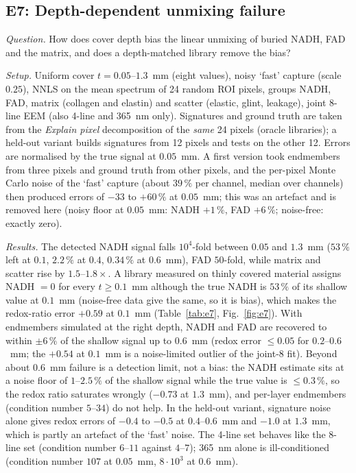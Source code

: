 \documentclass[journal]{IEEEtran}
\begin{document}
\subsection{E7: Depth-dependent unmixing failure}
\emph{Question.} How does cover depth bias the linear unmixing of buried NADH, FAD and the matrix, and does a depth-matched library remove the bias?

\emph{Setup.} Uniform cover $t=0.05$--$1.3$~mm (eight values), noisy `fast' capture (scale $0.25$), NNLS on the mean spectrum of 24 random ROI pixels, groups NADH, FAD, matrix (collagen and elastin) and scatter (elastic, glint, leakage), joint 8-line EEM (also 4-line and 365~nm only). Signatures and ground truth are taken from the \emph{Explain pixel} decomposition of the \emph{same} 24 pixels (oracle libraries); a held-out variant builds signatures from 12 pixels and tests on the other 12. Errors are normalised by the true signal at $0.05$~mm. A first version took endmembers from three pixels and ground truth from other pixels, and the per-pixel Monte Carlo noise of the `fast' capture (about $39\,\%$ per channel, median over channels) then produced errors of $-33$ to $+60\,\%$ at $0.05$~mm; this was an artefact and is removed here (noisy floor at $0.05$~mm: NADH $+1\,\%$, FAD $+6\,\%$; noise-free: exactly zero).

\emph{Results.} The detected NADH signal falls $10^4$-fold between $0.05$ and $1.3$~mm ($53\,\%$ left at $0.1$, $2.2\,\%$ at $0.4$, $0.34\,\%$ at $0.6$~mm), FAD $50$-fold, while matrix and scatter rise by $1.5$--$1.8\times$. A library measured on thinly covered material assigns NADH $=0$ for every $t\ge0.1$~mm although the true NADH is $53\,\%$ of its shallow value at $0.1$~mm (noise-free data give the same, so it is bias), which makes the redox-ratio error $+0.59$ at $0.1$~mm (Table~\ref{tab:e7}, Fig.~\ref{fig:e7}). With endmembers simulated at the right depth, NADH and FAD are recovered to within $\pm6\,\%$ of the shallow signal up to $0.6$~mm (redox error $\le0.05$ for $0.2$--$0.6$~mm; the $+0.54$ at $0.1$~mm is a noise-limited outlier of the joint-8 fit). Beyond about $0.6$~mm failure is a detection limit, not a bias: the NADH estimate sits at a noise floor of $1$--$2.5\,\%$ of the shallow signal while the true value is $\le0.3\,\%$, so the redox ratio saturates wrongly ($-0.73$ at $1.3$~mm), and per-layer endmembers (condition number $5$--$34$) do not help. In the held-out variant, signature noise alone gives redox errors of $-0.4$ to $-0.5$ at $0.4$--$0.6$~mm and $-1.0$ at $1.3$~mm, which is partly an artefact of the `fast' noise. The 4-line set behaves like the 8-line set (condition number $6$--$11$ against $4$--$7$); 365~nm alone is ill-conditioned (condition number $107$ at $0.05$~mm, $8\cdot10^3$ at $0.6$~mm).
\end{document}
